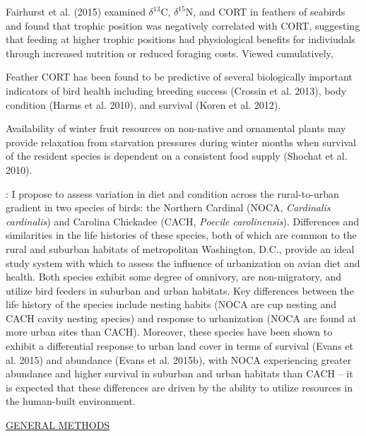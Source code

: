\documentclass[12pt]{article}
\begin{document}
\par

Fairhurst et al. (2015) examined $\delta^{13}$C,  $\delta^{15}$N, and CORT in feathers of seabirds and found that trophic position was negatively correlated with CORT, suggesting that feeding at higher trophic positions had physiological benefits for indiviudals through increased nutrition or reduced foraging costs.
Viewed cumulatively, \par


Feather CORT has been found to be predictive of several biologically important indicators of bird health including breeding success (Crossin et al. 2013), body condition (Harms et al. 2010), and survival (Koren et al. 2012).

Availability of winter fruit resources on non-native and ornamental plants may provide relaxation from starvation pressures during winter months when survival of the resident species is dependent on a consistent food supply (Shochat et al. 2010).


: I propose to assess variation in diet and condition across the rural-to-urban gradient in two species of birds: the Northern Cardinal (NOCA, \textit{Cardinalis cardinalis}) and Carolina Chickadee (CACH, \textit{Poecile carolinensis}). Differences and similarities in the life histories of these species, both of which are common to the rural and suburban habitats of metropolitan Washington, D.C., provide an ideal study system with which to assess the influence of urbanization on avian diet and health. Both species exhibit some degree of omnivory, are non-migratory, and utilize bird feeders in suburban and urban habitats. Key differences between the life history of the species include nesting habits (NOCA are cup nesting and CACH cavity nesting species) and response to urbanization (NOCA are found at more urban sites than CACH). Moreover, these species have been shown to exhibit a differential response to urban land cover in terms of survival (Evans et al. 2015) and abundance (Evans et al. 2015b), with NOCA experiencing greater abundance and higher survival in suburban and urban habitats than CACH -- it is expected that these differences are driven by the ability to utilize resources in the human-built environment.


\noindent \underline{GENERAL METHODS}\par
\end{document}
